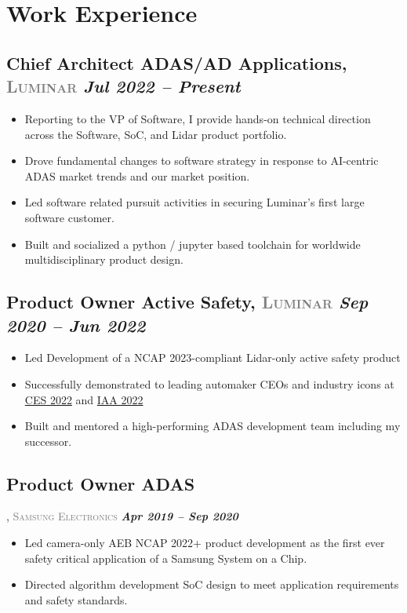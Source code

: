 \documentclass[10pt,a4paper]{article}
\begin{document}
\vspace{1.2em}

\section*{\textcolor{primary}{Work Experience}}

\subsection*{
  \textbf{\textcolor{jobtitlegreen}{Chief Architect ADAS/AD Applications}}, 
  \textcolor{gray}{\scshape Luminar} \hfill \textit{Jul 2022 – Present}
}
\begin{itemize}
    \item Reporting to the VP of Software, I provide hands-on technical direction across the Software, SoC, and Lidar product portfolio.
    \item Drove fundamental changes to software strategy in response to AI-centric ADAS market trends and our market position.
    \item Led software related pursuit activities in securing Luminar's first large software customer.
    \item Built and socialized a python / jupyter based toolchain for worldwide multidisciplinary product design.
\end{itemize}

\subsection*{
    \textbf{\textcolor{jobtitlegreen}{Product Owner Active Safety}}, 
    \textcolor{gray}{\scshape Luminar} \hfill \textcolor{primary}{\textbf{\textit{{Sep 2020 – Jun 2022}}}}
}
\begin{itemize}
    \item Led Development of a NCAP 2023-compliant Lidar-only active safety product
    \item Successfully demonstrated to leading automaker CEOs and industry icons at \href{https://ces.tech}{CES 2022} and \href{https://www.iaa-mobility.com}{IAA 2022}
    \item Built and mentored a high-performing ADAS development team including my successor.
\end{itemize}

\subsection*{
    \textbf{\textcolor{jobtitlegreen}{Product Owner ADAS}}}, 
    \textcolor{gray}{\scshape Samsung Electronics} \hfill \textcolor{primary}{\textbf{\textit{{Apr 2019 – Sep 2020}}}}
\begin{itemize}
    \item Led camera-only AEB NCAP 2022+ product development as the first ever safety critical application of a Samsung System on a Chip.
    \item Directed algorithm development SoC design to meet application requirements and safety standards.
\end{itemize}
\end{document}
